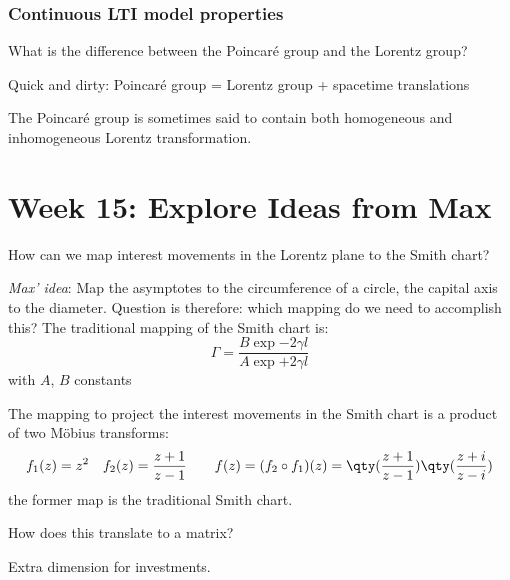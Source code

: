 \subsubsection*{Continuous LTI model properties}


\begin{question}
    What is the difference between the Poincaré group and the Lorentz group?
\end{question}
Quick and dirty: Poincaré group = Lorentz group + spacetime translations

The Poincaré group is sometimes said to contain both homogeneous and inhomogeneous Lorentz transformation.

\section{Week 15: Explore Ideas from Max}

\begin{question}
    How can we map interest movements in the Lorentz plane to the Smith chart?
\end{question}
\emph{Max' idea}: Map the asymptotes to the circumference of a circle, the capital axis to the diameter. Question is therefore: which mapping do we need to accomplish this? 
The traditional mapping of the Smith chart is:
$$ \Gamma = \frac{B\exp{-2\gamma l}}{A\exp{+2\gamma l}}$$
with $A$, $B$ constants

The mapping to project the interest movements in the Smith chart is a product of two Möbius transforms: 
$$ f_1(z) = z^2 \quad f_2(z) = \frac{z + 1}{z - 1}\qquad f(z) = (f_2 \circ f_1 )(z)  = \qty(\frac{z + 1}{z - 1})\qty(\frac{z + i}{z -i})$$
the former map is the traditional Smith chart.

How does this translate to a matrix?

\begin{question}
    Extra dimension for investments.
\end{question}